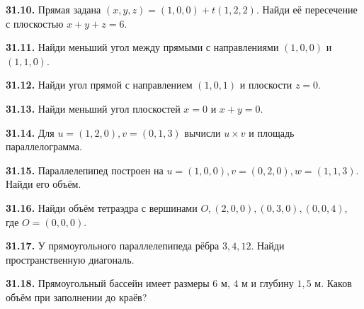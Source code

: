 \noindent\begin{minipage}[t]{\linewidth}\textbf{31.10.} Прямая задана \((x,y,z)=(1,0,0)+t(1,2,2)\). Найди её пересечение с плоскостью \(x+y+z=6\).\par\end{minipage}\par
\noindent\begin{minipage}[t]{\linewidth}\textbf{31.11.} Найди меньший угол между прямыми с направлениями \((1,0,0)\) и \((1,1,0)\).\par\end{minipage}\par
\noindent\begin{minipage}[t]{\linewidth}\textbf{31.12.} Найди угол прямой с направлением \((1,0,1)\) и плоскости \(z=0\).\par\end{minipage}\par
\noindent\begin{minipage}[t]{\linewidth}\textbf{31.13.} Найди меньший угол плоскостей \(x=0\) и \(x+y=0\).\par\end{minipage}\par
\noindent\begin{minipage}[t]{\linewidth}\textbf{31.14.} Для \(u=(1,2,0),v=(0,1,3)\) вычисли \(u\times v\) и площадь параллелограмма.\par\end{minipage}\par
\noindent\begin{minipage}[t]{\linewidth}\textbf{31.15.} Параллелепипед построен на \(u=(1,0,0),v=(0,2,0),w=(1,1,3)\). Найди его объём.\par\end{minipage}\par
\noindent\begin{minipage}[t]{\linewidth}\textbf{31.16.} Найди объём тетраэдра с вершинами \(O,(2,0,0),(0,3,0),(0,0,4)\), где \(O=(0,0,0)\).\par\end{minipage}\par
\noindent\begin{minipage}[t]{\linewidth}\textbf{31.17.} У прямоугольного параллелепипеда рёбра \(3,4,12\). Найди пространственную диагональ.\par\end{minipage}\par
\noindent\begin{minipage}[t]{\linewidth}\textbf{31.18.} Прямоугольный бассейн имеет размеры \(6\) м, \(4\) м и глубину \(1{,}5\) м. Каков объём при заполнении до краёв?\par\end{minipage}\par
